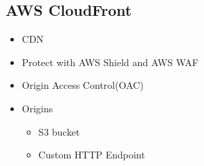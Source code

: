 \documentclass[../../main.tex]{subfiles}
\begin{document}
\subsection{AWS CloudFront}
\begin{itemize}
    \item CDN
    \item Protect with AWS Shield and AWS WAF
    \item Origin Access Control(OAC)
    \item Origins
    \begin{itemize}
        \item S3 bucket
        \item Custom HTTP Endpoint
    \end{itemize}
\end{itemize}
\end{document}
